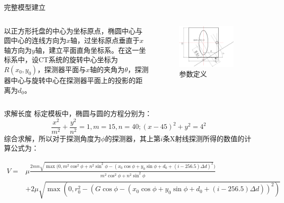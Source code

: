 \documentclass{beamer} %
\begin{document}
\begin{frame}{完整模型建立}
	\begin{columns}[t] 
		\begin{column}[c]{5cm} 
			以正方形托盘的中心为坐标原点，椭圆中心与圆中心的连线方向为\(x\)轴，过坐标原点垂直于\(x\)轴方向为\(y\)轴，建立平面直角坐标系。在这一坐标系中，设CT系统的旋转中心坐标为\(R(x_0,y_0)\)，探测器平面与\(x\)轴的夹角为\(\theta\)，探测器中心与旋转中心在探测器平面上的投影的距离为\(d_0\)。  
		\end{column} 
		\begin{column}[c]{5cm} 
			\begin{figure}
				\begin{center}
					\includegraphics[width=\textwidth]{pic/q13.png}
				\end{center}
				\caption{参数定义}
				\label{Fig:xian}
			\end{figure}
		\end{column} 
	\end{columns}
\end{frame}


\begin{frame}{求解长度}
	标定模板中，椭圆与圆的方程分别为：
	\[\frac{x^2}{m^2} + \frac{y^2}{n^2} = 1,m = 15,n = 40;(x - 45)^2 + y^2 = 4^2\]
	综合求解，所以对于探测角度为\(\phi\)的探测器，其上第\(i\)条X射线探测所得的数值的计算公式为：
	\begin{tiny}
		\begin{align*}\label{va}
			V = & \mu\frac{2mn\sqrt{\max(0,m^2\cos^2\phi + n^2\sin^2\phi - (x_0\cos\phi + y_0\sin\phi + d_0 +  (i - 256.5)\Delta d)^2})}{ m^2\cos^2\phi + n^2\sin^2\phi} \\
			    & + 2\mu\sqrt{\max(0,r_0^2 - (G\cos\phi - (x_0\cos\phi + y_0\sin\phi + d_0 +  (i - 256.5)\Delta d))^2)}                                                  
		\end{align*}
	\end{tiny}
\end{frame}
\end{document}
